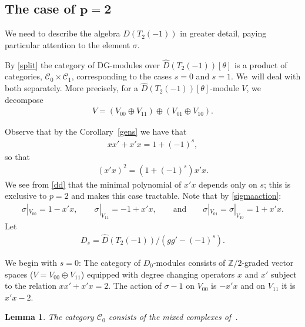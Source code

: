 \documentclass[11pt]{article}
\numberwithin{equation}{section}
\numberwithin{equation}{section}
\newtheorem{Lemma}[Theorem]{Lemma}
\newcommand{\Cc}{\mathcal{C}}
\begin{document}
\setcounter{subsection}{2}\setcounter{Theorem}{3}\setcounter{equation}{4}
\subsection[The case of p=2]{The case of $\boldsymbol{p=2}$}
We need to describe the algebra $\widehat{D}(T_2(-1))$ in greater detail, paying particular attention to the element $\sigma$.

By \eqref{split} the category of DG-modules over $\widehat{D}(T_2(-1))[\theta]$ is a product of categories, $\Cc_0\times \Cc_1$, corresponding to the cases $s=0$ and $s=1$. We~will deal with both separately. More precisely, for a $\widehat{D}(T_2(-1))[\theta]$-module $V$, we decompose
\begin{gather}
V=(V_{00}\oplus V_{11})\oplus(V_{01}\oplus V_{10}).
\end{gather}

Observe that by the Corollary~\ref{gens} we have that
\begin{gather}
xx'+x'x=1+(-1)^s,
\end{gather}
so that
\begin{gather}\label{dd}
(x'x)^2=(1+(-1)^s)x'x.
\end{gather}
We see from \eqref{dd} that the minimal polynomial of $x'x$ depends only on $s$; this is exclusive to $p=2$ and makes this case tractable. Note that by \eqref{sigmaaction}:
\begin{gather}\label{sig}
\sigma|_{V_{00}}=1-x'x,\qquad \sigma|_{V_{11}}=-1+x'x,\qquad\text{and}\qquad \sigma|_{V_{01}}=\sigma|_{V_{10}}=1+x'x.
\end{gather} Let
\begin{gather}
D_s=\widehat{D}(T_2(-1))/(gg'-(-1)^s).
\end{gather}

We begin with $s=0$: The category of $D_0$-modules consists of $\mathbb{Z}/2$-graded vector spaces ($V=V_{00}\oplus V_{11}$) equipped with degree changing operators $x$ and $x'$ subject to the relation $xx'+x'x=2$. The action of $\sigma-1$ on $V_{00}$ is $-x'x$ and on $V_{11}$ it is $x'x-2$.

\begin{Lemma}
The category $\Cc_0$ consists of the mixed complexes of~{\rm \cite{kassel}}.
\end{Lemma}
\end{document}
